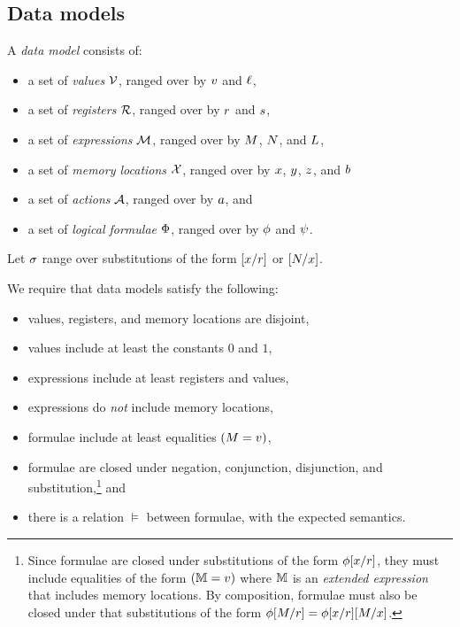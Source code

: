 
\subsection{Data models}
\label{sec:data:models}
A \emph{data model} consists of:
\begin{itemize}
\item a set of \emph{values} $\mathcal{V}$, ranged over by
  $v$ and $\ell$,
\item a set of \emph{registers} $\mathcal{R}$, ranged over by
  $r$ and $s$,
\item a set of \emph{expressions} $\mathcal{M}$, ranged over by
  $M$, $N$, and $L$, %
\item a set of \emph{memory locations} $\mathcal{X}$, ranged over by $x$,
  $y$, $z$, and $b$
\item a set of \emph{actions} $\mathcal{A}$, ranged over by $a$, and %
\item a set of \emph{logical formulae} $\Phi$, ranged over by
  $\phi$ and $\psi$.
\end{itemize}

Let $\sigma$ range over substitutions of the form
$[x/r]$ or $[N/x]$.

We require that data models satisfy the following:
\begin{itemize}
\item values, registers, and memory locations are disjoint,
\item values include at least the constants $0$ and $1$,
\item expressions include at least registers and values,
\item expressions do \emph{not} include memory locations, %
\item formulae include at least %
  equalities %
  $(M=v)$, %
\item formulae are closed under negation, conjunction, disjunction, and
  substitution,\!\footnote{Since formulae are closed under substitutions of the
    form $\phi[x/r]$, they must include equalities of the form
    $(\mathbb{M}=v)$ where $\mathbb{M}$ is an \emph{extended expression} that
    includes memory locations.  By composition, formulae must also be closed
    under that substitutions of the form
    $\phi[M/r]=\phi[x/r][M/x]$.} and
\item there is a relation $\vDash$ between formulae, with the expected semantics.
\end{itemize}

